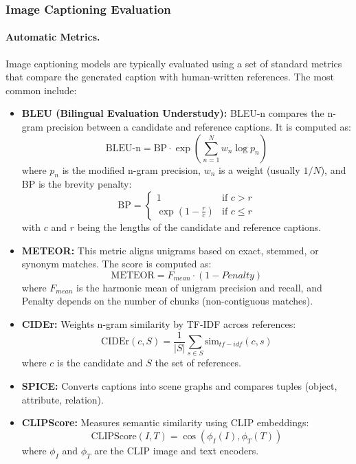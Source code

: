 \documentclass[conference]{IEEEtran}
\begin{document}
\subsubsection{Image Captioning Evaluation}

\paragraph{Automatic Metrics.} Image captioning models are typically evaluated using a set of standard metrics that compare the generated caption with human-written references. The most common include:

\begin{itemize}
	\item \textbf{BLEU (Bilingual Evaluation Understudy):} BLEU-n compares the n-gram precision between a candidate and reference captions. It is computed as:
	\begin{equation}
		\text{BLEU-n} = \text{BP} \cdot \exp\left( \sum_{n=1}^N w_n \log p_n \right)
	\end{equation}
	where $p_n$ is the modified n-gram precision, $w_n$ is a weight (usually $1/N$), and BP is the brevity penalty:
	\begin{equation}
		\text{BP} = 
		\begin{cases}
			1 & \text{if } c > r \\
			\exp(1 - \frac{r}{c}) & \text{if } c \leq r
		\end{cases}
	\end{equation}
	with $c$ and $r$ being the lengths of the candidate and reference captions.
	
	\item \textbf{METEOR:} This metric aligns unigrams based on exact, stemmed, or synonym matches. The score is computed as:
	\begin{equation}
		\text{METEOR} = F_{mean} \cdot (1 - Penalty)
	\end{equation}
	where $F_{mean}$ is the harmonic mean of unigram precision and recall, and Penalty depends on the number of chunks (non-contiguous matches).
	
	\item \textbf{CIDEr:} Weights n-gram similarity by TF-IDF across references:
	\begin{equation}
		\text{CIDEr}(c, S) = \frac{1}{|S|} \sum_{s \in S} \text{sim}_{tf-idf}(c, s)
	\end{equation}
	where $c$ is the candidate and $S$ the set of references.
	
	\item \textbf{SPICE:} Converts captions into scene graphs and compares tuples (object, attribute, relation).
	
	\item \textbf{CLIPScore:} Measures semantic similarity using CLIP embeddings:
	\begin{equation}
		\text{CLIPScore}(I, T) = \cos(\phi_I(I), \phi_T(T))
	\end{equation}
	where $\phi_I$ and $\phi_T$ are the CLIP image and text encoders.
\end{itemize}
\end{document}
